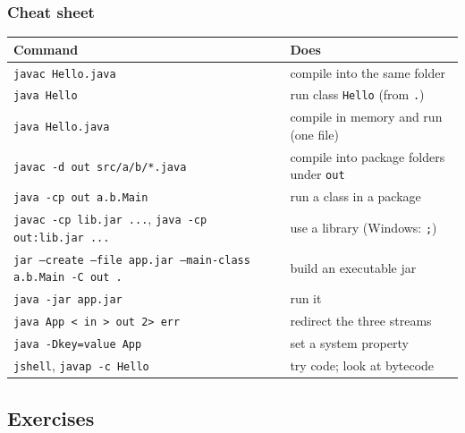 \documentclass[aspectratio=169,10pt,compress]{beamer}
\begin{document}
\begin{frame}[t,fragile] \frametitle{Cheat sheet}
  \footnotesize
  \begin{tabular}{@{}L{0.46\textwidth}L{0.46\textwidth}@{}}
    \toprule
    \textbf{Command} & \textbf{Does} \\
    \midrule
    \texttt{javac Hello.java}                          & compile into the same folder \\
    \texttt{java Hello}                                & run class \texttt{Hello} (from \texttt{.}) \\
    \texttt{java Hello.java}                           & compile in memory and run (one file) \\
    \texttt{javac -d out src/a/b/*.java}               & compile into package folders under \texttt{out} \\
    \texttt{java -cp out a.b.Main}                     & run a class in a package \\
    \texttt{javac -cp lib.jar ...}, \texttt{java -cp out:lib.jar ...} & use a library (Windows: \texttt{;}) \\
    \texttt{jar --create --file app.jar --main-class a.b.Main -C out .} & build an executable jar \\
    \texttt{java -jar app.jar}                         & run it \\
    \texttt{java App < in > out 2> err}                & redirect the three streams \\
    \texttt{java -Dkey=value App}                      & set a system property \\
    \texttt{jshell}, \texttt{javap -c Hello}           & try code; look at bytecode \\
    \bottomrule
  \end{tabular}
\end{frame}

\subsection[Exercises]{Exercises}
\end{document}
